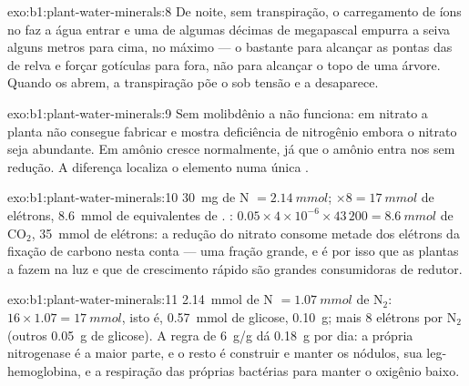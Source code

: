 \begin{solution}{exo:b1:plant-water-minerals:8}
De noite, sem transpiração, o carregamento de íons no  faz a
água entrar e uma  de algumas décimas de megapascal
empurra a seiva alguns metros para cima, no máximo --- o bastante para
alcançar as pontas das  de relva e forçar gotículas para fora,
não para alcançar o topo de uma árvore. Quando os  abrem, a
transpiração põe o  sob tensão e a  desaparece.
\end{solution}

\begin{solution}{exo:b1:plant-water-minerals:9}
Sem molibdênio a  não funciona: em nitrato a planta
não consegue fabricar  e mostra deficiência de nitrogênio
embora o nitrato seja abundante. Em amônio cresce normalmente, já que
o amônio entra nos  sem redução. A diferença localiza o
elemento numa única .
\end{solution}

\begin{solution}{exo:b1:plant-water-minerals:10}
\qty{30}{mg} de N $= \qty{2.14}{mmol}$; $\times 8 = \qty{17}{mmol}$ de
elétrons, \qty{8.6}{mmol} de equivalentes de . : $0.05\times
4\times 10^{-6}\times 43\,200 = \qty{8.6}{mmol}$ de $\mathrm{CO_2}$,
\qty{35}{mmol} de elétrons: a redução do nitrato consome metade dos
elétrons da fixação de carbono nesta conta --- uma fração grande, e é
por isso que as plantas a fazem na luz e que  de crescimento
rápido são grandes consumidoras de redutor.
\end{solution}

\begin{solution}{exo:b1:plant-water-minerals:11}
\qty{2.14}{mmol} de N $= \qty{1.07}{mmol}$ de $\mathrm{N_2}$: 
$16\times 1.07 = \qty{17}{mmol}$, isto é, \qty{0.57}{mmol} de glicose,
\qty{0.10}{g}; mais 8 elétrons por $\mathrm{N_2}$ (outros
\qty{0.05}{g} de glicose). A regra de \qty{6}{g/g} dá \qty{0.18}{g} por
dia: a própria nitrogenase é a maior parte, e o resto é construir e
manter os nódulos, sua leg-hemoglobina, e a respiração das próprias
bactérias para manter o oxigênio baixo.
\end{solution}

